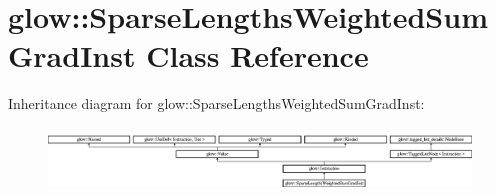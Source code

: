 \hypertarget{classglow_1_1_sparse_lengths_weighted_sum_grad_inst}{}\section{glow\+:\+:Sparse\+Lengths\+Weighted\+Sum\+Grad\+Inst Class Reference}
\label{classglow_1_1_sparse_lengths_weighted_sum_grad_inst}
Inheritance diagram for glow\+:\+:Sparse\+Lengths\+Weighted\+Sum\+Grad\+Inst\+:\begin{figure}[H]
\begin{center}
\leavevmode
\includegraphics[height=1.729730cm]{classglow_1_1_sparse_lengths_weighted_sum_grad_inst}
\end{center}
\end{figure}
